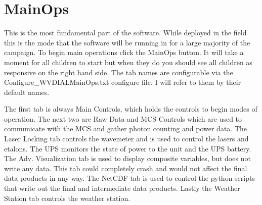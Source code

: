 
\chapter{MainOps}
\label{CH-Ops}

This is the most fundamental part of the software. While deployed in the field this is the mode that the software will be running in for a large majority of the campaign. To begin main operations click the MainOps button. It will take a moment for all children to start but when they do you should see all children as responsive on the right hand side. The tab names are configurable via the Configure\_WVDIALMainOps.txt configure file. I will refer to them by their default names. 

The first tab is always Main Controls, which holds the controls to begin modes of operation. The next two are Raw Data and MCS Controls which are used to communicate with the MCS and gather photon counting and power data. The Laser Locking tab controls the wavemeter and is used to control the lasers and etalons. The UPS monitors the state of power to the unit and the UPS battery. The Adv. Visualization tab is used to display composite variables, but does not write any data. This tab could completely crash and would not affect the final data products in any way. The NetCDF tab is used to control the python scripts that write out the final and intermediate data products. Lastly the Weather Station tab controls the weather station. 

